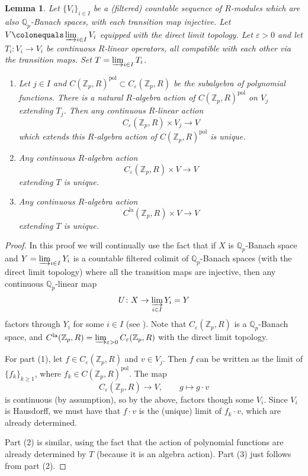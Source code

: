 \documentclass[10pt, oneside]{amsart}
\newcommand{\defeq}{\colonequals}
\numberwithin{equation}{subsection}
\newtheorem{lemma}[equation]{Lemma}
\theoremstyle{definition}
\theoremstyle{remark}
\newcommand{\mbb}[1]{\mathbb{#1}}
\newcommand{\opn}[1]{\operatorname{#1}}
\begin{document}
\begin{lemma} \label{UniquenessOfActionsLemma}
Let $\{ V_i \}_{i \in I}$ be a (filtered) countable sequence of $R$-modules which are also $\mbb{Q}_p$-Banach spaces, with each transition map injective. Let $V \defeq \varinjlim_{i \in I} V_i$ equipped with the direct limit topology. Let $\varepsilon > 0$ and let $T_i \colon V_i \to V_i$ be continuous $R$-linear operators, all compatible with each other via the transition maps. Set $T = \varinjlim_{i \in I}T_i$.
\begin{enumerate}
    \item Let $j \in I$ and $C(\mbb{Z}_p, R)^{\opn{pol}} \subset C_{\varepsilon}(\mbb{Z}_p, R)$ be the subalgebra of polynomial functions. There is a natural $R$-algebra action of $C(\mbb{Z}_p, R)^{\opn{pol}}$ on $V_j$ extending $T_j$. Then any continuous $R$-linear action 
    \[
    C_{\varepsilon}(\mbb{Z}_p, R) \times V_j \to V
    \]
    which extends this $R$-algebra action of $C(\mbb{Z}_p, R)^{\opn{pol}}$ is unique.
    \item Any continuous $R$-algebra action
    \[
    C_{\varepsilon}(\mbb{Z}_p, R) \times V \to V
    \]
    extending $T$ is unique.
    \item Any continuous $R$-algebra action
    \[
    C^{\opn{la}}(\mbb{Z}_p, R) \times V \to V
    \]
    extending $T$ is unique.
\end{enumerate}
\end{lemma}
\begin{proof}
In this proof we will continually use the fact that if $X$ is $\mbb{Q}_p$-Banach space and $Y = \varinjlim_{i \in I}Y_i$ is a countable filtered colimit of $\mbb{Q}_p$-Banach spaces (with the direct limit topology) where all the transition maps are injective, then any continuous $\mbb{Q}_p$-linear map
\[
U \colon X \to \varinjlim_{i \in I} Y_i = Y
\]
factors through $Y_i$ for some $i \in I$ (see \cite[Corollary 8.9]{Schneider}). Note that $C_{\varepsilon}(\mbb{Z}_p, R)$ is a $\mbb{Q}_p$-Banach space, and $C^{\opn{la}}(\mbb{Z}_p, R) = \varinjlim_{\varepsilon > 0} C_{\varepsilon}(\mbb{Z}_p, R)$ with the direct limit topology. 

For part (1), let $f \in C_{\varepsilon}(\mbb{Z}_p, R)$ and $v \in V_j$. Then $f$ can be written as the limit of $\{f_k\}_{k \geq 1}$, where $f_k \in C(\mbb{Z}_p, R)^{\opn{pol}}$. The map
\[
C_{\varepsilon}(\mbb{Z}_p, R) \to V, \quad \quad g \mapsto g \cdot v
\]
is continuous (by assumption), so by the above, factors though some $V_i$. Since $V_i$ is Hausdorff, we must have that $f \cdot v$ is the (unique) limit of $f_k \cdot v$, which are already determined.

Part (2) is similar, using the fact that the action of polynomial functions are already determined by $T$ (because it is an algebra action). Part (3) just follows from part (2).
\end{proof}
\end{document}
